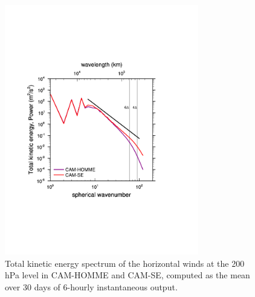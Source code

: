 \begin{figure}[h]
\centering
\includegraphics[width=20pc]{figs/kespectra.pdf}
\caption{Total kinetic energy spectrum of the horizontal winds at the 200 hPa level in CAM-HOMME and CAM-SE, computed as the mean over 30 days of 6-hourly instantaneous output.}
\label{fig:kespectra}
\end{figure}

